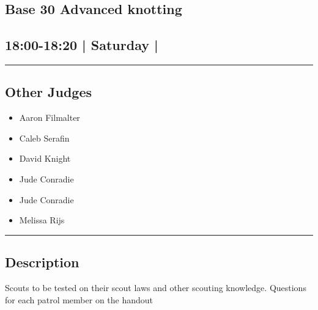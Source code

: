 \documentclass[10pt, A5]{article}
\begin{document}
	

		\begin{framed}
			\begin{minipage}{\textwidth}

			\setcounter{section}{65}
							\section{\faStar \: Base 30 \faStar \: Advanced knotting}
						
			\subsection*{18:00-18:20 | Saturday | }

			\vspace{0.25cm}
			\hrule
			\vspace{0.25cm}


			\subsection*{Other Judges}
							

				\begin{multicols}{2}

			\begin{itemize}
											\item Aaron Filmalter
											\item Caleb Serafin
											\item David Knight
											\item Jude Conradie
								\end{itemize}

			\vfill\null
			\columnbreak

			\begin{itemize}
											\item Jude Conradie
											\item Melissa Rijs
								\end{itemize}

			\vfill\null

			\end{multicols}

			\vspace{0.25cm}
			\hrule
			\vspace{0.25cm}

			\begin{minipage}{\textwidth}
			\subsection*{\faListAlt \: Description}
			Scouts to be tested on their scout laws and other scouting knowledge. Questions for each patrol member on the handout
			\end{minipage}


	\end{minipage}
	\end{framed}
\end{document}
